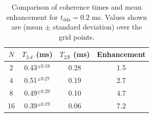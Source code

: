 \documentclass[%
 reprint,
 superscriptaddress,
 amsmath,amssymb,
 aps,
 prx,
]{revtex4-2}
\begin{document}
\begin{table}[h]
\centering
\caption{Comparison of coherence times and mean enhancement for $t_{\text{dds}}=0.2$ ms. Values shown are (mean $\pm$ standard deviation) over the grid points.
}
\begin{tabular}{|c| c| c |c|}
\hline
$N$ & $T_{2\mathcal{A}}$ (ms) & $T_{2\mathcal{B}}$ (ms) & Enhancement \\
\hline
\rule{0pt}{2.5ex}
2   & 0.43$^{\pm0.18}$  & 0.28  & 1.5 \\
\hline
\rule{0pt}{2.5ex}
4   & 0.51$^{\pm0.27}$  & 0.19  & 2.7 \\
\hline
\rule{0pt}{2.5ex}
8   & 0.49$^{\pm0.29}$  & 0.10  & 4.7 \\
\hline
\rule{0pt}{2.5ex}
16   & 0.39$^{\pm0.19}$  & 0.06  & 7.2 \\
\hline
\end{tabular}
\label{tab:t2_comparison1}
\end{table}
\end{document}
